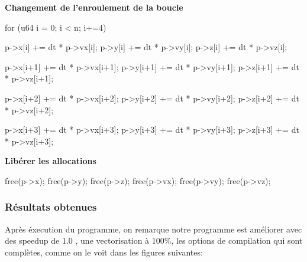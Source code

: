 \documentclass[a4paper, 12pt, twoside]{article}
\begin{document}
\textbf{Changement de l'enroulement de la boucle}
\begin{customFrame}
for (u64 i = 0; i < n; i+=4)
    {
      p->x[i] += dt * p->vx[i];
      p->y[i] += dt * p->vy[i];
      p->z[i] += dt * p->vz[i];

      p->x[i+1] += dt * p->vx[i+1];
      p->y[i+1] += dt * p->vy[i+1];
      p->z[i+1] += dt * p->vz[i+1];


      p->x[i+2] += dt * p->vx[i+2];
      p->y[i+2] += dt * p->vy[i+2];
      p->z[i+2] += dt * p->vz[i+2];


      p->x[i+3] += dt * p->vx[i+3];
      p->y[i+3] += dt * p->vy[i+3];
      p->z[i+3] += dt * p->vz[i+3];
    }
\end{customFrame}
\textbf{Libérer les allocations}
\begin{customFrame}
    free(p->x);
    free(p->y);
    free(p->z);
    free(p->vx);
    free(p->vy);
    free(p->vz);
\end{customFrame}
\newpage

\subsubsection*{Résultats obtenues}
Après éxecution du programme, on remarque notre programme est améliorer avec des speedup de 1.0 , une vectorisation à 100\%, les options de compilation qui sont complètes, comme on le voit dans les figures suivantes:
\end{document}
